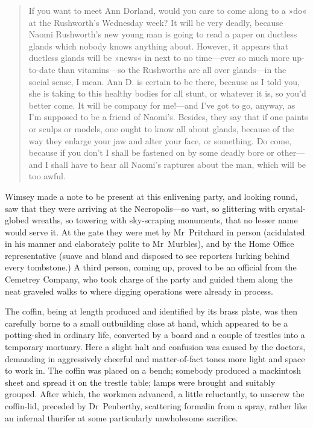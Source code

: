 \begin{quote}If you want to meet Ann Dorland, would you care to come along to a »do« at the Rushworth's Wednesday week? It will be very deadly, because Naomi Rushworth's new young man is going to read a paper on ductless glands which nobody knows anything about. However, it appears that ductless glands will be »news« in next to no time—ever so much more up-to-date than vitamins—so the Rushworths are all over glands—in the social sense, I mean. Ann D\@. is certain to be there, because as I told you, she is taking to this healthy bodies for all stunt, or whatever it is, so you'd better come. It will be company for me!—and I've got to go, anyway, as I'm supposed to be a friend of Naomi's. Besides, they say that if one paints or sculps or models, one ought to know all about glands, because of the way they enlarge your jaw and alter your face, or something. Do come, because if you don't I shall be fastened on by some deadly bore or other—and I shall have to hear all Naomi's raptures about the man, which will be too awful.
\end{quote}

Wimsey made a note to be present at this enlivening party, and looking round, saw that they were arriving at the Necropolis—so vast, so glittering with crystal-globed wreaths, so towering with sky-scraping monuments, that no lesser name would serve it. At the gate they were met by Mr~Pritchard in person (acidulated in his manner and elaborately polite to Mr~Murbles), and by the Home Office representative (suave and bland and disposed to see reporters lurking behind every tombstone.) A third person, coming up, proved to be an official from the Cemetrey Company, who took charge of the party and guided them along the neat graveled walks to where digging operations were already in process.

The coffin, being at length produced and identified by its brass plate, was then carefully borne to a small outbuilding close at hand, which appeared to be a potting-shed in ordinary life, converted by a board and a couple of trestles into a temporary mortuary. Here a slight halt and confusion was caused by the doctors, demanding in aggressively cheerful and matter-of-fact tones more light and space to work in. The coffin was placed on a bench; somebody produced a mackintosh sheet and spread it on the trestle table; lamps were brought and suitably grouped. After which, the workmen advanced, a little reluctantly, to unscrew the coffin-lid, preceded by Dr~Penberthy, scattering formalin from a spray, rather like an infernal thurifer at some particularly unwholesome sacrifice.


